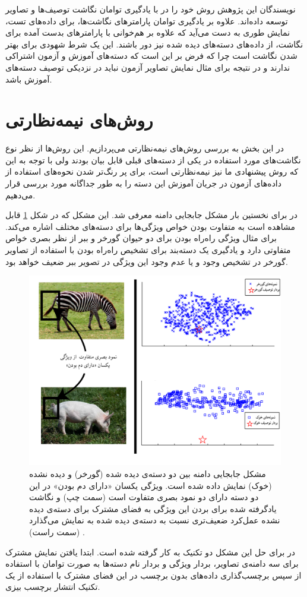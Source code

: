 نویسندگان این پژوهش روش خود را در \cite{agnostic} با یادگیری توامان نگاشت توصیف‌ها و تصاویر توسعه داده‌اند. علاوه بر یادگیری توامان پارامترهای نگاشت‌ها، برای داده‌های تست، نمایش طوری به دست می‌آید که علاوه بر هم‌خوانی با پارامترهای بدست آمده برای نگاشت، از داده‌های دسته‌های دیده شده نیز دور باشند. این یک شرط شهودی برای بهتر شدن نگاشت است چرا که فرض بر این است که دسته‌های آموزش و آزمون اشتراکی ندارند و در نتیجه برای مثال نمایش تصاویر آزمون نباید در نزدیکی توصیف دسته‌های آموزش باشد.

\section{روش‌های نیمه‌نظارتی}\label{lr:semi}
در این بخش به بررسی روش‌های نیمه‌نظارتی می‌پردازیم. این روش‌ها از نظر نوع نگاشت‌های مورد استفاده در یکی از دسته‌های قبلی قابل بیان بودند ولی با توجه به این که روش پیشنهادی ما نیز نیمه‌نظارتی است، برای پر رنگ‌تر شدن نحوه‌های استفاده از داده‌های آزمون در جریان آموزش این دسته را به طور جداگانه مورد بررسی قرار می‌دهیم.

در \cite{Fu2014} برای نخستین بار مشکل جابجایی دامنه معرفی شد. این مشکل که در شکل 
\ref{fig:domain_shift}
قابل مشاهده است به متفاوت بودن خواص ویژگی‌ها برای دسته‌های مختلف اشاره می‌کند. برای مثال ویژگی راه‌راه بودن برای دو حیوان گورخر و ببر از نظر بصری خواص متفاوتی دارد و یادگیری یک دسته‌بند برای تشخیص راه‌راه بودن با استفاده از تصاویر گورخر در تشخیص وجود و یا عدم وجود این ویژگی در تصویر ببر ضعیف خواهد بود.

\begin{figure}[h]
\centering
\includegraphics[width=0.7\linewidth]{images/domain_shift}
\caption[مشکل جابجایی دامنه]{
مشکل جابجایی دامنه بین دو دسته‌ی دیده شده (گورخر) و دیده نشده (خوک) نمایش داده شده است. ویژگی یکسان «دارای دم بودن» در این دو دسته دارای دو نمود بصری متفاوت است (سمت چپ) و نگاشت یادگرفته شده برای بردن این ویژگی به فضای مشترک برای دسته‌ی دیده نشده عمل‌کرد ضعیف‌تری نسبت به دسته‌ی دیده شده به نمایش می‌گذارد (سمت راست) 
\cite{Fu2014}.}
\label{fig:domain_shift}
\end{figure}
 در \cite{Fu2014} 
برای حل این مشکل دو تکنیک به کار گرفته شده است. ابتدا یافتن نمایش مشترک برای سه دامنه‌ی تصاویر، بردار ویژگی و بردار نام دسته‌ها به صورت توامان با استفاده از 
\cite{cca}
سپس برچسب‌گذاری داده‌های بدون برچسب در این فضای مشترک با استفاده از یک تکنیک انتشار برچسب بیزی. 

